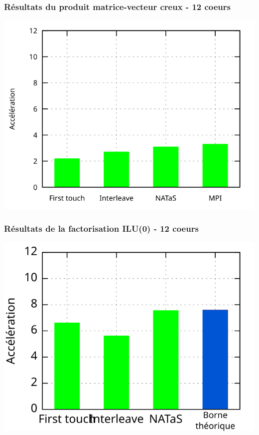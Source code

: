 \documentclass{beamer}
\begin{document}
\begin{frame}
  \frametitle{Résultats du produit matrice-vecteur creux - 12 coeurs}

  \centerline{\includegraphics[width=0.8\linewidth]{res_ilu_spmv}}

\end{frame}

\begin{frame}
  \frametitle{Résultats de la factorisation ILU(0) - 12 coeurs}

  \centerline{\includegraphics[width=0.8\linewidth]{res_ilu_nas}}

\end{frame}


\end{document}

